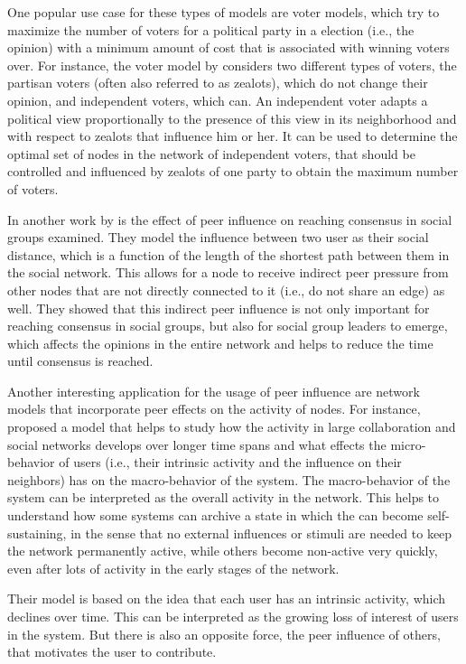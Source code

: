 One popular use case for these types of models are voter models, which try to maximize the number of voters for a political party in a election (i.e., the opinion) with a minimum amount of cost that is associated with winning voters over.
For instance, the voter model by \citet{Masuda2015} considers two different types of voters, the partisan voters (often also referred to as zealots), which do not change their opinion, and independent voters, which can.
An independent voter adapts a political view proportionally to the presence of this view in its neighborhood and with respect to zealots that influence him or her.
It can be used to determine the optimal set of nodes in the network of independent voters, that should be controlled and influenced by zealots of one party to obtain the maximum number of voters.

In another work by \citet{Estrada2013} is the effect of peer influence on reaching consensus in social groups examined.
They model the influence between two user as their social distance, which is a function of the length of the shortest path between them in the social network.
This allows for a node to receive indirect peer pressure from other nodes that are not directly connected to it (i.e., do not share an edge) as well.
They showed that this indirect peer influence is not only important for reaching consensus in social groups, but also for social group leaders to emerge, which affects the opinions in the entire network and helps to reduce the time until consensus is reached.

Another interesting application for the usage of peer influence are network models that incorporate peer effects on the activity of nodes.
For instance, \citet{Walk2016} proposed a model that helps to study how the activity in large collaboration and social networks develops over longer time spans and what effects the micro-behavior of users (i.e., their intrinsic activity and the influence on their neighbors) has on the macro-behavior of the system.
The macro-behavior of the system can be interpreted as the overall activity in the network.
This helps to understand how some systems can archive a state in which the can become self-sustaining, in the sense that no external influences or stimuli are needed to keep the network permanently active, while others become non-active very quickly, even after lots of activity in the early stages of the network.

Their model is based on the idea that each user has an intrinsic activity, which declines over time.
This can be interpreted as the growing loss of interest of users in the system.
But there is also an opposite force, the peer influence of others, that motivates the user to contribute.

